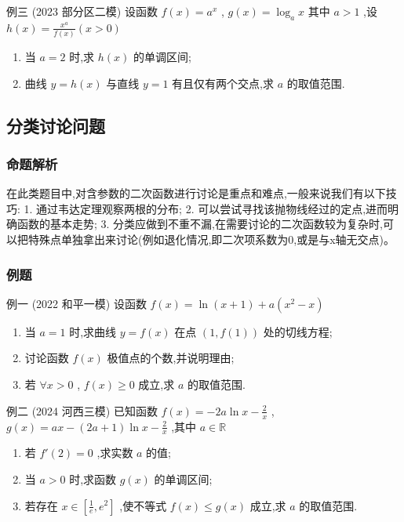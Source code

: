 \documentclass{article}
\begin{document}
例三 (2023 部分区二模) 设函数 $f(x)=a^x$ , $g(x)=\log_a x$ 其中 $a>1$ ,设 $h(x)=\frac{x^a}{f(x)}(x>0)$
\begin{enumerate}
\item[(I)] 当 $a=2$ 时,求 $h(x)$ 的单调区间;
\item[(II)] 曲线 $y=h(x)$ 与直线 $y=1$ 有且仅有两个交点,求 $a$ 的取值范围.
\end{enumerate}
\vspace{20\baselineskip}

\newpage
\subsection{分类讨论问题}
\subsubsection{命题解析}
在此类题目中,对含参数的二次函数进行讨论是重点和难点,一般来说我们有以下技巧:
1. 通过韦达定理观察两根的分布;
2. 可以尝试寻找该抛物线经过的定点,进而明确函数的基本走势;
3. 分类应做到不重不漏,在需要讨论的二次函数较为复杂时,可以把特殊点单独拿出来讨论(例如退化情况,即二次项系数为0,或是与x轴无交点)。

\subsubsection{例题}

例一 (2022 和平一模) 设函数 $f(x)=\ln (x+1)+a(x^2-x)$
\begin{enumerate}
\item[(I)] 当 $a=1$ 时,求曲线 $y=f(x)$ 在点 $(1, f(1))$ 处的切线方程;
\item[(II)] 讨论函数 $f(x)$ 极值点的个数,并说明理由;
\item[(III)] 若 $\forall x>0$ , $f(x) \geq0$ 成立,求 $a$ 的取值范围.
\end{enumerate}
\vspace{20\baselineskip}

例二 (2024 河西三模) 已知函数 $f(x)=-2 a \ln x-\frac{2}{x}$ , $g(x)=a x-(2 a+1) \ln x-\frac{2}{x}$ ,其中 $a \in \mathbb{R}$
\begin{enumerate}
\item[(I)] 若 $f'(2)=0$ ,求实数 $a$ 的值;
\item[(II)] 当 $a>0$ 时,求函数 $g(x)$ 的单调区间;
\item[(III)] 若存在 $x \in\left[\frac{1}{e}, e^2\right]$ ,使不等式 $f(x) \leq g(x)$ 成立,求 $a$ 的取值范围.
\end{enumerate}
\vspace{20\baselineskip}
\end{document}
